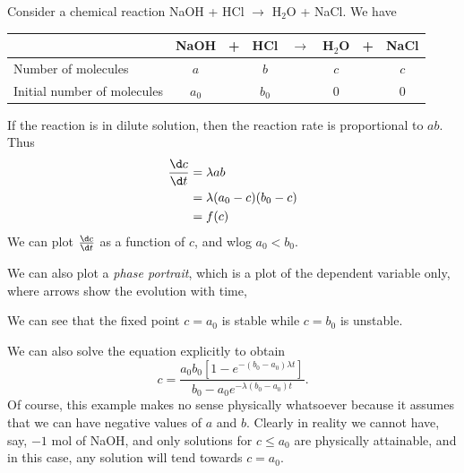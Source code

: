 \documentclass[a4paper]{article}
\begin{document}
\begin{eg}
  Consider a chemical reaction NaOH + HCl $\rightarrow$ H$_2$O + NaCl. We have
  \begin{center}
    \begin{tabular}{lccccccc}
      \toprule
      & NaOH  & + & HCl   & $\rightarrow$ & H$_2$O & + & NaCl \\
      \midrule
      Number of molecules         & $a$   &   & $b$   &               & $c$    &   & $c$ \\
      Initial number of molecules & $a_0$ &   & $b_0$ &               & $0$    &   & $0$ \\
      \bottomrule
    \end{tabular}
  \end{center}
  If the reaction is in dilute solution, then the reaction rate is proportional to $ab$. Thus
  \begin{align*}
    \frac{\d c}{\d t} &= \lambda ab\\
    &= \lambda (a_0 - c)(b_0 - c)\\
    &= f(c)
  \end{align*}
  We can plot $\frac{\d c}{\d t}$ as a function of $c$, and wlog $a_0 < b_0$.
  \begin{center}
  \end{center}
  We can also plot a \emph{phase portrait}, which is a plot of the dependent variable only, where arrows show the evolution with time,
  \begin{center}
  \end{center}
  We can see that the fixed point $c = a_0$ is stable while $c = b_0$ is unstable.

  We can also solve the equation explicitly to obtain
  \[
    c = \frac{a_0b_0[1 - e^{-(b_0 - a_0)\lambda t}]}{b_0 - a_0e^{-\lambda(b_0-a_0)t}}.
  \]
  Of course, this example makes no sense physically whatsoever because it assumes that we can have negative values of $a$ and $b$. Clearly in reality we cannot have, say, $-1$ mol of NaOH, and only solutions for $c \leq a_0$ are physically attainable, and in this case, any solution will tend towards $c = a_0$.
\end{eg}
\end{document}
